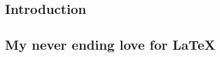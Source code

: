 \documentclass[a4paper,twoside,openany,12pt]{memoir}
\begin{document}
\titlepage
\frontmatter
% 
% 
% 
% 
\tableofcontents
\listoffigures
\printglossary[type=\acronymtype]
\mainmatter

\begin{refsection}
\chapter{\label{ch1}Introduction} 

\printbibliography[title={References}]
\end{refsection}


\begin{refsection}
\chapter{\label{ch2}My never ending love for \LaTeX} 




\printbibliography[title={References}]
\end{refsection}

% 



% 

\clearpage
\printglossary
\end{document}
